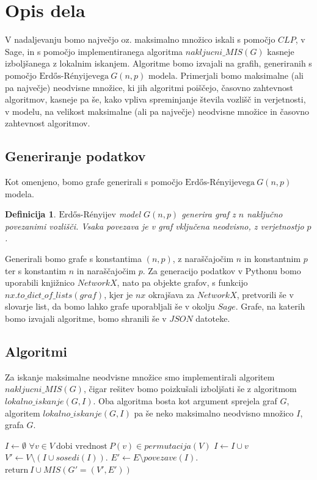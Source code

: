 \documentclass[a4paper, 12pt]{article}
\newtheorem{definicija}{Definicija}
\begin{document}
\newpage

\section{Opis dela}
V nadaljevanju bomo največjo oz. maksimalno množico iskali s pomočjo $CLP$, v Sage, in s pomočjo implementiranega algoritma $nakljucni\_MIS(G)$ kasneje izboljšanega z lokalnim
iskanjem. Algoritme bomo izvajali na grafih, generiranih s pomočjo $\text{Erdős-Rényijevega}\ G(n,p)$ modela. Primerjali bomo maksimalne (ali pa največje) neodvisne množice, ki jih algoritmi poiščejo,
časovno zahtevnost algoritmov, kasneje pa še, kako vpliva spreminjanje števila vozlišč in verjetnosti, v modelu, na velikost maksimalne (ali pa največje) neodvisne množice in 
časovno zahtevnost algoritmov.

\subsection{Generiranje podatkov}
Kot omenjeno, bomo grafe generirali s pomočjo $\text{Erdős-Rényijevega}\ G(n,p)$ modela.

\begin{definicija}
    $\text{Erdős-Rényijev}$ model $G(n, p)$ generira graf z $n$ naključno povezanimi vozlišči. Vsaka povezava je v graf vključena neodvisno, z verjetnostjo $p$.
\end{definicija}

Generirali bomo grafe s konstantima $(n,p)$, z naraščajočim $n$ in konstantnim $p$ ter s konstantim $n$ in naraščajočim $p$. Za generacijo podatkov v Pythonu bomo uporabili
knjižnico $NetworkX$, nato pa objekte grafov, s funkcijo $nx.to\_dict\_of\_lists(graf)$, kjer je $nx$ okrajšava za $NetworkX$, pretvorili še v slovarje list, da bomo lahko grafe uporabljali še v okolju $Sage$.
Grafe, na katerih bomo izvajali algoritme, bomo shranili še v $JSON$ datoteke.


\subsection{Algoritmi}

Za iskanje maksimalne neodvisne množice smo implementirali algoritem $nakljucni\_MIS(G)$, čigar rešitev bomo poizkušali izboljšati še z algoritmom $lokalno\_iskanje(G, I)$. Oba
algoritma bosta kot argument sprejela graf $G$, algoritem $lokalno\_iskanje(G, I)$ pa še neko maksimalno neodvisno množico $I$, grafa $G$.

\begin{algorithm}
\caption{$nakljucni\_MIS(G)$}\label{euclid}
\begin{algorithmic}[1]
\State $\textit{I} \gets \emptyset$
\State $\forall v \in V\ \text{dobi vrednost}\ \textit{P}(v) \in \textit{permutacija}(V)$
\State $ I \gets I \cup v $
\EndIf
\State $V' \gets V \setminus (I \cup \textit{sosedi}(I))$.
\State $E' \gets E \setminus \textit{povezave}(I)$.
\State $\text{return}\  I \cup \textit{MIS}(G'=(V', E'))$
\end{algorithmic}
\end{algorithm}
\end{document}
